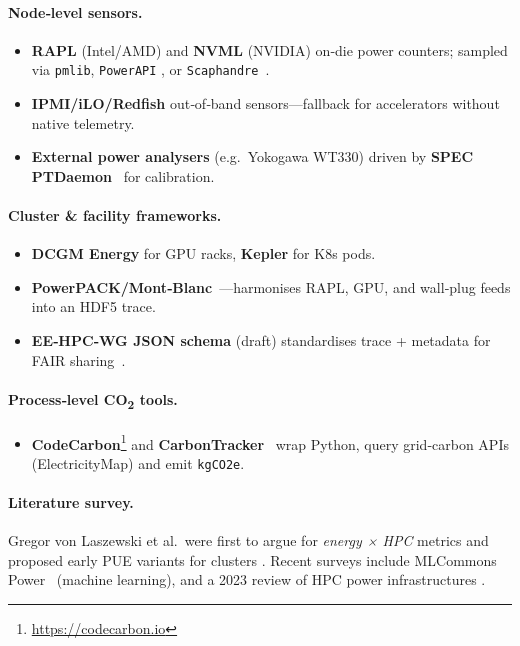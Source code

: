 \paragraph*{Node‑level sensors.}
\begin{itemize}
  \item \textbf{RAPL} (Intel/AMD) and \textbf{NVML} (NVIDIA) on‑die power
        counters; sampled via \texttt{pmlib}, \texttt{PowerAPI}
        \cite{ibmpowerapipmli}, or \texttt{Scaphandre}~\cite{scaphandre}.
  \item \textbf{IPMI/iLO/Redfish} out‑of‑band sensors—fallback for
        accelerators without native telemetry.
  \item \textbf{External power analysers} (e.g.\ Yokogawa WT330) driven
        by \textbf{SPEC PTDaemon}~\cite{specptdaemonser} for calibration.
\end{itemize}

\paragraph*{Cluster \& facility frameworks.}
\begin{itemize}
  \item \textbf{DCGM Energy} for GPU racks, \textbf{Kepler} for K8s pods.
  \item \textbf{PowerPACK/Mont‑Blanc}~\cite{powerpackmontbl}—harmonises
        RAPL, GPU, and wall‑plug feeds into an HDF5 trace.
  \item \textbf{EE‑HPC‑WG JSON schema} (draft) standardises trace +
        metadata for FAIR sharing~\cite{eehpcwgenergybe}.
\end{itemize}

\paragraph*{Process‑level CO\textsubscript{2} tools.}
\begin{itemize}
  \item \textbf{CodeCarbon}\footnote{\url{https://codecarbon.io}}
        and \textbf{CarbonTracker}~\cite{carbontracker} wrap Python,
        query grid‑carbon APIs (ElectricityMap) and emit
        \texttt{kgCO2e}.
\end{itemize}

\paragraph*{Literature survey.}
Gregor von Laszewski et al.\ were first to argue for \emph{energy × HPC}
metrics and proposed early PUE variants for clusters
\cite{laszewski2010}.  Recent surveys include
MLCommons Power~\cite{mlperfpower} (machine learning),
and a 2023 review of HPC power infrastructures \cite{openifsenergy2023}.

